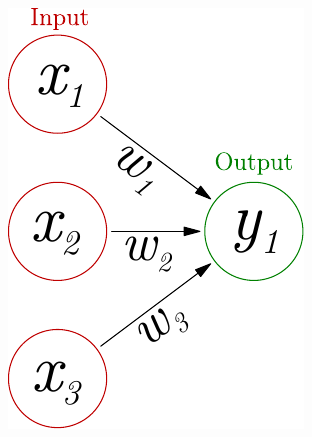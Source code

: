 \documentclass{beamer}
\newcommand{\figheight}{0.72\textheight}
\begin{document}
\begin{frame}
\begin{columns}[T]
\begin{column}{.55\textwidth}
\begin{figure}
 \begin{flushleft}

 \includegraphics[height = \figheight]{./fig/perceptron_maths.pdf}

\end{flushleft}%
\end{figure}
    \end{column}
  \end{columns}
\end{frame}
\end{document}

